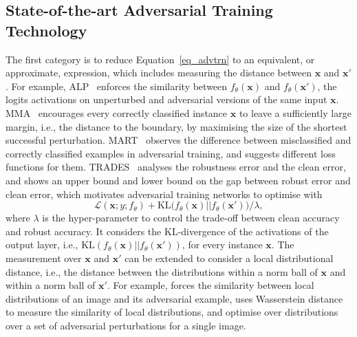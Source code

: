 \subsection{State-of-the-art Adversarial Training Technology}
The first category is to reduce Equation~\ref{eq_advtrn} to an equivalent, or approximate, expression, which includes measuring the distance between $\mathbf{x}$ and $\mathbf{x}'$.
For example, ALP~\cite{engstrom2018evaluating,kannan2018adversarial} enforces the similarity between $f_\theta(\mathbf{x})$ and $f_\theta(\mathbf{x'})$, the logits activations on unperturbed and adversarial versions of the same input $\mathbf{x}$.
MMA~\cite{ding2018mma} encourages every correctly classified instance $\mathbf{x}$ to leave a sufficiently large margin, i.e., the distance to the boundary, by maximising the size of the shortest successful perturbation. 
MART~\cite{wang2019improving} observes the difference between misclassified and correctly classified examples in adversarial training, and suggests different loss functions for them. 
TRADES~\cite{zhang2019theoretically} analyses the robustness error and the clean error, and shows an upper bound and lower bound on the gap between robust error and clean error, which motivates adversarial training networks to optimise with
\begin{equation}
\mathcal{L}(\mathbf{x}; y; f_\theta)+\mathrm{KL}\big(f_\theta (\mathbf{x})||f_\theta (\mathbf{x}')\big)/\lambda,
\end{equation}
where $\lambda$ is the hyper-parameter to control the trade-off between clean accuracy and robust accuracy. 
It considers the $\mathrm{KL}$-divergence of the activations of the output layer, i.e., $\mathrm{KL}(f_\theta(\mathbf{x})||f_\theta(\mathbf{x}'))$, for every instance $\mathbf{x}$.
The measurement over $\mathbf{x}$ and $\mathbf{x}'$ can be extended to consider a local distributional distance, i.e., the distance between the distributions within a norm ball of $\mathbf{x}$ and within a norm ball of $\mathbf{x}'$. 
For example, \cite{Zheng_Chen_Ren_2019} forces the similarity between local distributions of an image and its adversarial example, \cite{SJ2017} uses Wasserstein distance to measure the similarity of local distributions, and  \cite{dong2020adversarial,NEURIPS2020_5de8a360,dong2020benchmarking,mao2019metric,pang2020bag} optimise over distributions over a set of adversarial perturbations for a single image.






